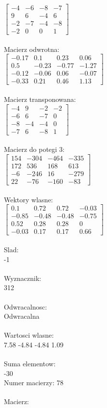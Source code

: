 \documentclass[a4paper,12pt]{article}
\begin{document}
$\begin{bmatrix} -4&-6&-8&-7\\9&6&-4&6\\-2&-7&-4&-8\\-2&0&0&1 \end{bmatrix}$
\\
\\
Macierz odwrotna:\\

$\begin{bmatrix} -0.17&0.1&0.23&0.06\\0.5&-0.23&-0.77&-1.27\\-0.12&-0.06&0.06&-0.07\\-0.33&0.21&0.46&1.13 \end{bmatrix}$
\\
\\
Macierz transponowana:\\

$\begin{bmatrix} -4&9&-2&-2\\-6&6&-7&0\\-8&-4&-4&0\\-7&6&-8&1 \end{bmatrix}$
\\
\\
Macierz do potegi 3:\\

$\begin{bmatrix} 154&-304&-464&-335\\172&536&168&613\\-6&-246&16&-279\\22&-76&-160&-83 \end{bmatrix}$
\\
\\
Wektory wlasne:\\

$\begin{bmatrix} 0.1&0.72&0.72&-0.03\\-0.85&-0.48&-0.48&-0.75\\0.52&0.28&0.28&0\\-0.03&0.17&0.17&0.66 \end{bmatrix}$
\\
\\
Slad:\\
-1
\\
\\
Wyznacznik:\\
312
\\
\\
Odwracalnosc:\\
Odwracalna
\\
\\
Wartosci wlasne:\\
7.58 -4.84 -4.84 1.09
\\
\\
Suma elementow:\\
-30
\\
\newpage
Numer macierzy:
78
\\
\\
Macierz:\\
\end{document}

